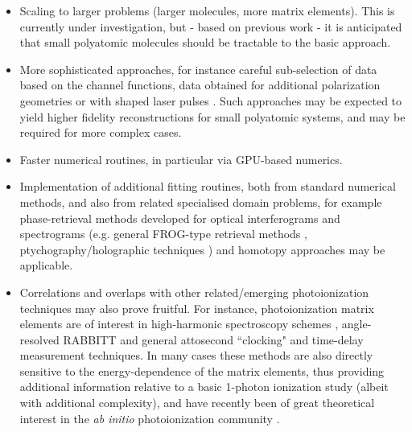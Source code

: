 \begin{itemize}
\item Scaling to larger problems (larger molecules, more matrix elements). This is currently under investigation, but - based on previous work \cite{hockett2009RotationallyResolvedPhotoelectron, hockett2018QMP2} - it is anticipated that small polyatomic molecules should be tractable to the basic approach. 
\item More sophisticated approaches, for instance careful sub-selection of data based on the channel functions, data obtained for additional polarization geometries or with shaped laser pulses \cite{hockett2014CompletePhotoionizationExperiments, hockett2015CoherentControlPhotoelectron, hockett2015CompletePhotoionizationExperiments,hockett2018QMP1}. Such approaches may be expected to yield higher fidelity reconstructions for small polyatomic systems, and may be required for more complex cases.
\item Faster numerical routines, in particular via GPU-based numerics.
\item Implementation of additional fitting routines, both from standard numerical methods, and also from related specialised domain problems, for example phase-retrieval methods developed for optical interferograms and spectrograms (e.g. general FROG-type retrieval methods \cite{trebino2000FrequencyResolvedOpticalGating}, ptychography/holographic techniques \cite{Spangenberg2015b, Spangenberg2015c}) and homotopy \cite{Sommese2005} approaches may be applicable.
\item Correlations and overlaps with other related/emerging photoionization techniques may also prove fruitful. For instance, photoionization matrix elements are of interest in high-harmonic spectroscopy schemes \cite{Lock2012}, angle-resolved RABBITT \cite{hockett2017AngleresolvedRABBITTTheory,villeneuve2017CoherentImagingAttosecond} and general attosecond ``clocking" and time-delay measurement techniques. In many cases these methods are also directly sensitive to the energy-dependence of the matrix elements, thus providing additional information relative to a basic 1-photon ionization study (albeit with additional complexity), and have recently been of great theoretical interest in the \textit{ab initio} photoionization community \cite{Feist2014,benda2022AnalysisRABITTTime}.

\end{itemize}

